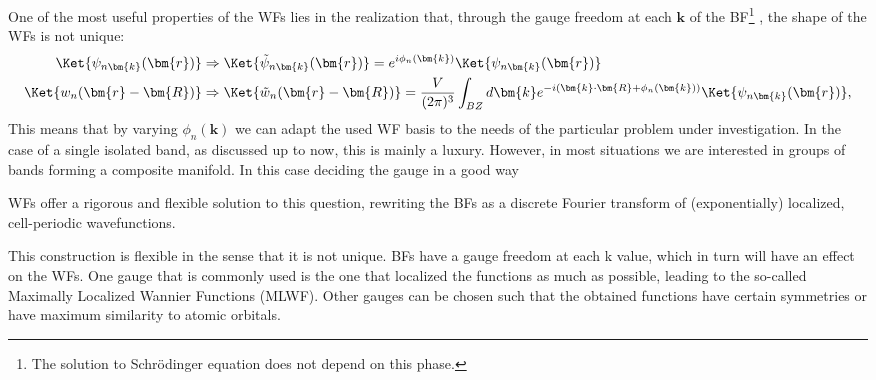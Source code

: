 One of the most useful properties of the WFs lies in the realization that, through the gauge freedom at each $\bm{k}$ of the BF\footnote{The solution to Schr\"odinger equation does not depend on this phase.} , the shape of the WFs is not unique:
\begin{align}
	\Ket{\psi_{n\bm{k}}(\bm{r})} &\Rightarrow \Ket{\tilde{\psi}_{n\bm{k}}(\bm{r})} = e^{i \phi_n(\bm{k})} \Ket{\psi_{n\bm{k}}(\bm{r})} \\
	\Ket{w_{n}(\bm{r} - \bm{R})} &\Rightarrow \Ket{\tilde{w}_{n}(\bm{r} - \bm{R})} = \frac{V}{(2\pi)^3} \int_{BZ} d \bm{k} e^{-i (\bm{k} \cdot \bm{R} + \phi_n(\bm{k}))} \Ket{\psi_{n\bm{k}}(\bm{r})},
\end{align}
This means that by varying $\phi_n(\bm{k})$ we can adapt the used WF basis to the needs of the particular problem under investigation.
In the case of a single isolated band, as discussed up to now, this is mainly a luxury. However, in most situations we are interested in groups of bands forming a composite manifold. In this case deciding the gauge in a good way  

WFs offer a rigorous and flexible solution to this question, rewriting the BFs as a discrete Fourier transform of (exponentially) localized, cell-periodic wavefunctions.

This construction is flexible in the sense that it is not unique. BFs have a gauge freedom at each k value, which in turn will have an effect on the WFs.
One gauge that is commonly used is the one that localized the functions as much as possible, leading to the so-called Maximally Localized Wannier Functions (MLWF).
Other gauges can be chosen such that the obtained functions have certain symmetries or have maximum similarity to atomic orbitals.


